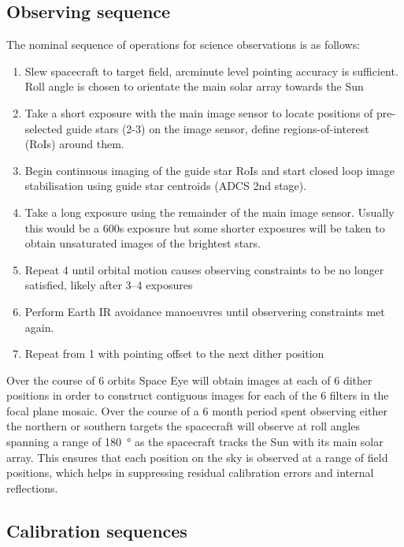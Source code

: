 \documentclass[]{iac}
\begin{document}
\subsection{Observing sequence}

The nominal sequence of operations for science observations is as follows:

\begin{enumerate}
  \item{Slew spacecraft to target field, arcminute level pointing accuracy is sufficient. Roll angle is chosen to
    orientate the main solar array towards the Sun}
  \item{Take a short exposure with the main image sensor to locate positions of pre-selected guide stars (2-3) on the
    image sensor, define regions-of-interest (RoIs) around them.}
  \item{Begin continuous imaging of the guide star RoIs and start closed loop image stabilisation using guide star
    centroids (ADCS 2nd stage).}
  \item{Take a long exposure using the remainder of the main image sensor. Usually this would be a 600s exposure but
    some shorter exposures will be taken to obtain unsaturated images of the brightest stars.}
  \item{Repeat 4 until orbital motion causes observing constraints to be no longer satisfied, likely after 3--4
    exposures}
  \item{Perform Earth IR avoidance manoeuvres until observering constraints met again.}
  \item{Repeat from 1 with pointing offset to the next dither position}
\end{enumerate}

Over the course of 6 orbits Space Eye will obtain images at each of 6 dither positions in order to construct contiguous
images for each of the 6 filters in the focal plane mosaic. Over the course of a 6 month period spent observing either
the northern or southern targets the spacecraft will observe at roll angles spanning a range of \SI{180}{\degree} as the
spacecraft tracks the Sun with its main solar array. This ensures that each position on the sky is observed at a range
of field positions, which helps in suppressing residual calibration errors and internal reflections.

\subsection{Calibration sequences}
\end{document}

